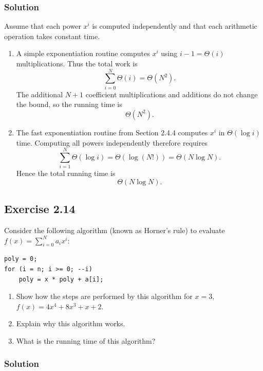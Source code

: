\documentclass[12pt,a4paper]{article}
\begin{document}
\subsubsection*{\color{sectionnavy}Solution}

Assume that each power $x^i$ is computed independently and that each
arithmetic operation takes constant time.

\begin{enumerate}
  \renewcommand{\labelenumi}{\alph{enumi}.}

  \item A simple exponentiation routine computes $x^i$ using
  $i-1=\Theta(i)$ multiplications. Thus the total work is
  \[
  \sum_{i=0}^{N}\Theta(i)=\Theta(N^2).
  \]
  The additional $N+1$ coefficient multiplications and additions do not
  change the bound, so the running time is
  \[
  \boxed{\Theta(N^2)}.
  \]

  \item The fast exponentiation routine from Section 2.4.4 computes
  $x^i$ in $\Theta(\log i)$ time. Computing all powers independently
  therefore requires
  \[
  \sum_{i=1}^{N}\Theta(\log i)
  =\Theta(\log(N!))
  =\Theta(N\log N).
  \]
  Hence the total running time is
  \[
  \boxed{\Theta(N\log N)}.
  \]
\end{enumerate}

\subsection*{\color{sectionnavy}Exercise 2.14}

\noindent
Consider the following algorithm (known as Horner's rule) to evaluate
$f(x)=\sum_{i=0}^{N}a_i x^i$:

\begin{lstlisting}
poly = 0;
for (i = n; i >= 0; --i)
    poly = x * poly + a[i];
\end{lstlisting}

\begin{enumerate}
  \renewcommand{\labelenumi}{\alph{enumi}.}
  \item Show how the steps are performed by this algorithm for $x=3$,
  $f(x)=4x^4+8x^3+x+2$.
  \item Explain why this algorithm works.
  \item What is the running time of this algorithm?
\end{enumerate}

\subsubsection*{\color{sectionnavy}Solution}
\end{document}
